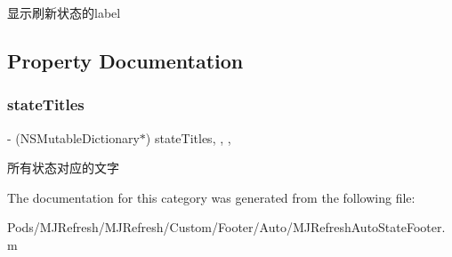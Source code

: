 显示刷新状态的label 

\subsection{Property Documentation}
\mbox{\label{category_m_j_refresh_auto_state_footer_07_08_a1f81e5ffb9c1e2ef511f40038c3b7f2c}} 
\subsubsection{\texorpdfstring{state\+Titles}{stateTitles}}
{\footnotesize\ttfamily -\/ (N\+S\+Mutable\+Dictionary$\ast$) state\+Titles\hspace{0.3cm}{\ttfamily [read]}, {\ttfamily [write]}, {\ttfamily [nonatomic]}, {\ttfamily [strong]}}

所有状态对应的文字 

The documentation for this category was generated from the following file\+:\begin{DoxyCompactItemize}
\item 
Pods/\+M\+J\+Refresh/\+M\+J\+Refresh/\+Custom/\+Footer/\+Auto/M\+J\+Refresh\+Auto\+State\+Footer.\+m\end{DoxyCompactItemize}
